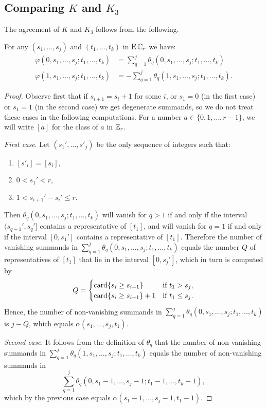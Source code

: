 \subsection{Comparing $K$ and $K_3$}\label{ss:comparins K and K3}

The agreement of $K$ and $K_3$ follows from the following.

\begin{lemma*}
	For any $(s_1,\dots,s_j)$ and $(t_1,\dots,t_k)$ in $\operatorname{E}\mathbb{C}_r$ we have:
	\begin{align*}
		\varphi(0,s_1,\dots,s_j;t_1,\dots,t_k) &= \sum_{q=1}^j \theta_q(0,s_1,\dots,s_j;t_1,\dots,t_k) \\
		\varphi(1,s_1,\dots,s_j;t_1,\dots,t_k) &= -\sum_{q=1}^j \theta_q(1,s_1,\dots,s_j;t_1,\dots,t_k).
	\end{align*}
\end{lemma*}

\begin{proof}
	Observe first that if $s_{i+1} = s_i+1$ for some $i$, or $s_1 = 0$ (in the first case) or $s_1=1$ (in the second case) we get degenerate summands, so we do not treat these cases in the following computations.
	For a number $a\in \{0,1,\dots,r-1\}$, we will write $[a]$ for the class of $a$ in $\mathbb{Z}_{r}$.

	\vspace*{5pt}\noindent\textit{First case}.
	Let $(s_1',\dots,s'_j)$ be the only sequence of integers such that:
	\begin{enumerate}
		\item $[s'_i] = [s_i]$,
		\item $0< s_1'< r$,
		\item $1 < s_{i+1}' - s_i' \leq r$.
	\end{enumerate}
	Then $\theta_q(0,s_1,\dots,s_j;t_1,\dots,t_k)$ will vanish for $q>1$ if and only if the interval $(s_{q-1}',s_q']$ contains a representative of $[t_1]$, and will vanish for $q=1$ if and only if the interval $[0,s_1']$ contains a representative of $[t_1]$.
	Therefore the number of vanishing summands in $\sum_{q=1}^j\theta_q(0,s_1,\dots,s_j;t_1,\dots,t_k)$ equals the number $Q$ of representatives of $[t_1]$ that lie in the interval $[0,s_j']$, which in turn is computed by
	\[
	Q =
	\begin{cases}
		\operatorname{card}\{s_i \geq s_{i+1}\} & \text{if } t_1 > s_j, \\
		\operatorname{card}\{s_i \geq s_{i+1}\} + 1 & \text{if } t_1 \leq s_j.
	\end{cases}
	\]
	Hence, the number of non-vanishing summands in $\sum_{q=1}^j\theta_q(0,s_1,\dots,s_j;t_1,\dots,t_k)$ is $j-Q$, which equals $\alpha(s_1,\dots,s_j,t_1)$.

	\vspace*{5pt}\noindent\textit{Second case}.
	It follows from the definition of $\theta_q$ that the number of non-vanishing summands in $\sum_{q=1}^j \theta_q(1,s_1,\dots,s_j;t_1,\dots,t_k)$ equals the number of non-vanishing summands in
	\[
	\sum_{q=1}^j \theta_q(0,s_1-1,\dots,s_j-1;t_1-1,\dots,t_k-1),
	\]
	which by the previous case equals $\alpha(s_1-1,\dots,s_j-1,t_1-1)$.
\end{proof}